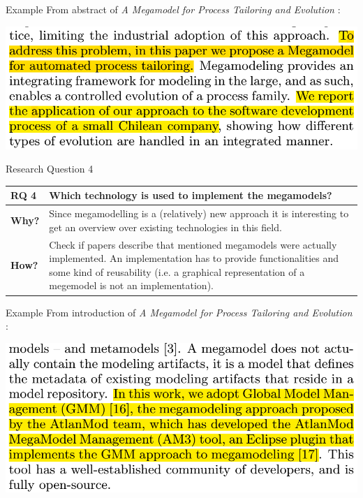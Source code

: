 \documentclass{beamer}
\begin{document}
\begin{frame}{Example}
From abstract of \textit{A Megamodel for Process Tailoring and Evolution} \cite{tailoring}:
\begin{center}
\includegraphics[width=1.0\textwidth]{ex_rq3}
\end{center}
\end{frame}

\begin{frame}{Research Question 4}
\begin{tabular}{|l|p{9cm}|}\hline
\textbf{RQ 4} & Which technology is used to implement the megamodels?\\\hline
\textbf{Why?} & Since megamodelling is a (relatively) new approach it is interesting to get an overview over existing technologies in this field.\\\hline
\textbf{How?} & Check if papers describe that mentioned megamodels were actually implemented. An implementation has to provide functionalities and some kind of reusability (i.e. a graphical representation of a megemodel is not an implementation).\\\hline
\end{tabular}
\end{frame}

\begin{frame}{Example}
From introduction of \textit{A Megamodel for Process Tailoring and Evolution} \cite{tailoring}:
\begin{center}
\includegraphics[width=1.0\textwidth]{ex_rq4}
\end{center}
\end{frame}
\end{document}
